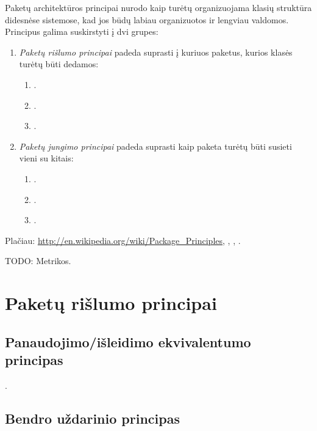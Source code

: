 
Paketų architektūros principai nurodo kaip turėtų organizuojama klasių
struktūra didesnėse sistemose, kad jos būdų labiau organizuotos
ir lengviau valdomos. Principus galima suskirstyti į dvi grupes:
\begin{enumerate}
  \item \emph{Paketų rišlumo principai} padeda suprasti į kuriuos
    paketus, kurios klasės turėtų būti dedamos:
    \begin{enumerate}
      \item {}.
      \item {}.
      \item {}.
    \end{enumerate}
  \item \emph{Paketų jungimo principai} padeda suprasti kaip paketa
    turėtų būti susieti vieni su kitais:
    \begin{enumerate}
      \item {}.
      \item {}.
      \item {}.
    \end{enumerate}
\end{enumerate}

Plačiau: \url{http://en.wikipedia.org/wiki/Package\_Principles},
\cite{martin2000design}, \cite{martin1995designing},
\cite{martin2003agile}.

TODO: Metrikos.

\section{Paketų rišlumo principai}

\subsection{Panaudojimo/išleidimo ekvivalentumo principas}

\label{subsection:package:rep}

.

\subsection{Bendro uždarinio principas}

